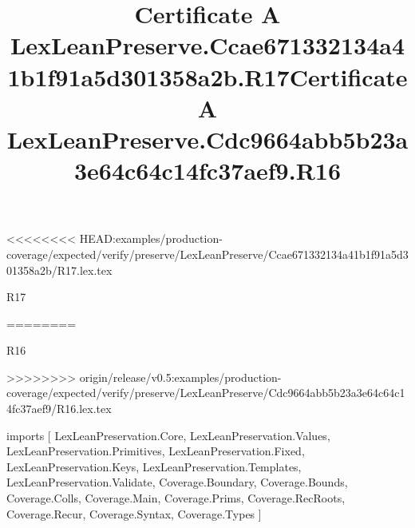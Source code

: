 <<<<<<<< HEAD:examples/production-coverage/expected/verify/preserve/LexLeanPreserve/Ccae671332134a41b1f91a5d301358a2b/R17.lex.tex
\begin{lexlean}{R17}
\title{Certificate A LexLeanPreserve.Ccae671332134a41b1f91a5d301358a2b.R17}
========
\begin{lexlean}{R16}
\title{Certificate A LexLeanPreserve.Cdc9664abb5b23a3e64c64c14fc37aef9.R16}
>>>>>>>> origin/release/v0.5:examples/production-coverage/expected/verify/preserve/LexLeanPreserve/Cdc9664abb5b23a3e64c64c14fc37aef9/R16.lex.tex
\begin{coremodule}
imports [
  LexLeanPreservation.Core,
  LexLeanPreservation.Values,
  LexLeanPreservation.Primitives,
  LexLeanPreservation.Fixed,
  LexLeanPreservation.Keys,
  LexLeanPreservation.Templates,
  LexLeanPreservation.Validate,
  Coverage.Boundary,
  Coverage.Bounds,
  Coverage.Colls,
  Coverage.Main,
  Coverage.Prims,
  Coverage.RecRoots,
  Coverage.Recur,
  Coverage.Syntax,
  Coverage.Types
]


\end{coremodule}
\end{lexlean}
\end{lexlean}
